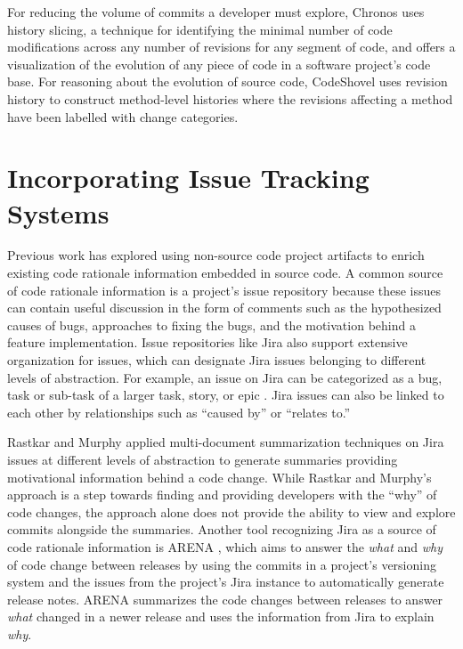 For reducing the volume of commits a developer must explore, Chronos \cite{servant_history_2012} uses history slicing, a technique for identifying the minimal number of code modifications across any number of revisions for any segment of code, and offers a visualization of the evolution of any piece of code in a software project's code base.
For reasoning about the evolution of source code, CodeShovel \cite{grund_codeshovel_2021} uses revision history to construct method-level histories where the revisions affecting a method have been labelled with change categories.

\section{Incorporating Issue Tracking Systems}

Previous work has explored using non-source code project artifacts to enrich existing code rationale information embedded in source code. 
A common source of code rationale information is a project's issue repository because these issues can contain useful discussion in the form of comments such as the hypothesized causes of bugs, approaches to fixing the bugs, and the motivation behind a feature implementation. 
Issue repositories like Jira also support extensive organization for issues, which can designate Jira issues belonging to different levels of abstraction.
For example, an issue on Jira can be categorized as a bug, task or sub-task of a larger task, story, or epic \cite{jira-issue-types}.
Jira issues can also be linked to each other by relationships such as ``caused by'' or ``relates to.''

Rastkar and Murphy \cite{rastkar_why_2013} applied multi-document summarization techniques on Jira issues at different levels of abstraction to generate summaries providing motivational information behind a code change.
While Rastkar and Murphy's approach is a step towards finding and providing developers with the ``why'' of code changes, the approach alone does not provide the ability to view and explore commits alongside the summaries.
Another tool recognizing Jira as a source of code rationale information is ARENA \cite{moreno_arena_2017}, which aims to answer the \emph{what} and \emph{why} of code change between releases by using the commits in a project's versioning system and the issues from the project's Jira instance to automatically generate release notes. 
ARENA summarizes the code changes between releases to answer \emph{what} changed in a newer release and uses the information from Jira to explain \emph{why}.

